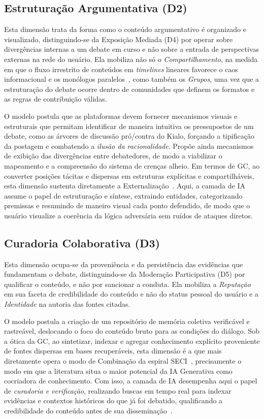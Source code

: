 \documentclass[conference]{IEEEtran} \IEEEoverridecommandlockouts %
\begin{document}
\subsection{Estruturação Argumentativa (D2)}
Esta dimensão trata da forma como o conteúdo argumentativo é organizado e visualizado, distinguindo-se da Exposição Mediada (D4) por operar sobre divergências internas a um debate em curso e não sobre a entrada de perspectivas externas na rede do usuário. Ela mobiliza não só o \textit{Compartilhamento}, na medida em que o fluxo irrestrito de conteúdos em \textit{timelines} lineares favorece o caos informacional e os monólogos paralelos~\cite{kietzmannSocialMediaGet2011}, como também os \textit{Grupos}, uma vez que a estruturação do debate ocorre dentro de comunidades que definem os formatos e as regras de contribuição válidas.

O modelo postula que as plataformas devem fornecer mecanismos visuais e estruturais que permitam identificar de maneira intuitiva os pressupostos de um debate, como as árvores de discussão pró/contra do Kialo, forçando a tipificação da postagem e combatendo a \textit{ilusão da racionalidade}. Propõe ainda mecanismos de exibição das divergências entre debatedores, de modo a viabilizar o mapeamento e a compreensão do sistema de crenças alheio. Em termos de GC, ao converter posições tácitas e dispersas em estruturas explícitas e compartilháveis, esta dimensão sustenta diretamente a Externalização~\cite{nonaka1994dynamic}. Aqui, a camada de IA assume o papel de estruturação e síntese, extraindo entidades, categorizando premissas e resumindo de maneiro visual cada ponto defendido, de modo que o usuário visualize a coerência da lógica adversária sem ruídos de ataques diretos.

\subsection{Curadoria Colaborativa (D3)}

Esta dimensão ocupa-se da proveniência e da persistência das evidências que fundamentam o debate, distinguindo-se da Moderação Participativa (D5) por qualificar o conteúdo, e não por sancionar a conduta. Ela mobiliza a \textit{Reputação} em sua faceta de credibilidade do conteúdo e não do status pessoal do usuário e a \textit{Identidade} na autoria das fontes citadas. 

O modelo postula a criação de um repositório de memória coletiva verificável e rastreável, deslocando o foco do conteúdo bruto para as condições do diálogo. Sob a ótica da GC, ao sintetizar, indexar e agregar conhecimento explícito proveniente de fontes dispersas em bases recuperáveis, esta dimensão é a que mais diretamente opera o modo de Combinação da espiral SECI~\cite{nonaka1994dynamic}, precisamente o modo em que a literatura situa o maior potencial da IA Generativa como cocriadora de conhecimento. Com isso, a camada de IA desempenha aqui o papel de \textit{curadoria e verificação}, realizando buscas em tempo real para indexar evidências e contextos históricos do que já foi debatido, qualificando a credibilidade do conteúdo antes de sua disseminação~\cite{schneiderAImediatedCollaborativeCrowdsourcing2025, oktaviaConceptualModelKnowledge2017}.
\end{document}
